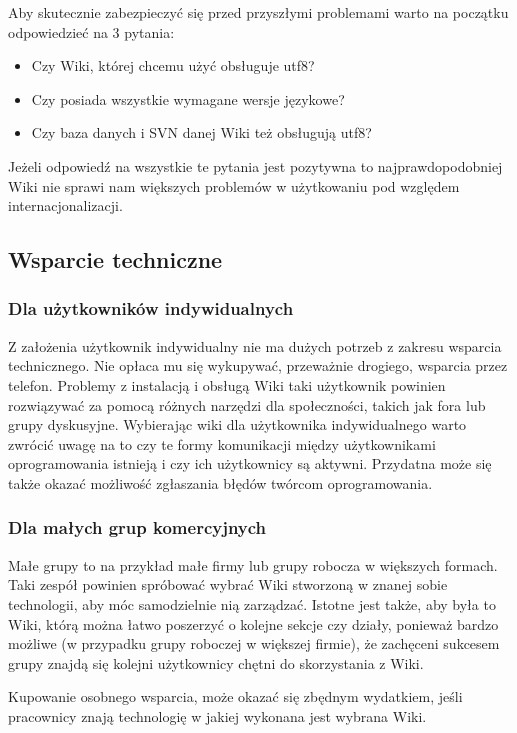 \documentclass{article}
\begin{document}
		
		Aby skutecznie zabezpieczyć się przed przyszłymi problemami warto na początku odpowiedzieć na 3 pytania:  
		\begin{itemize}
			\item Czy Wiki, której chcemu użyć obsługuje utf8?
			\item Czy posiada wszystkie wymagane wersje językowe?
			\item Czy baza danych i SVN danej Wiki też obsługują utf8?
		\end{itemize}
		Jeżeli odpowiedź na wszystkie te pytania jest pozytywna to najprawdopodobniej Wiki nie sprawi nam większych problemów w użytkowaniu pod względem internacjonalizacji.
	
	\subsection{Wsparcie techniczne}
		\subsubsection{Dla użytkowników indywidualnych}


			Z założenia użytkownik indywidualny nie ma dużych potrzeb z zakresu wsparcia technicznego. Nie opłaca mu się wykupywać, przeważnie drogiego, wsparcia przez telefon. Problemy z instalacją i obsługą Wiki taki użytkownik powinien rozwiązywać za pomocą różnych narzędzi dla społeczności, takich jak fora lub grupy dyskusyjne. Wybierając wiki dla użytkownika indywidualnego warto zwrócić uwagę na to czy te formy komunikacji między użytkownikami oprogramowania istnieją i czy ich użytkownicy są aktywni. Przydatna może się także okazać możliwość zgłaszania błędów twórcom oprogramowania.
		
		\subsubsection{Dla małych grup komercyjnych}


			Małe grupy to na przykład małe firmy lub grupy robocza w większych formach. Taki zespół powinien spróbować wybrać Wiki stworzoną w znanej sobie technologii, aby móc samodzielnie nią zarządzać. Istotne jest także, aby była to Wiki, którą można łatwo poszerzyć o kolejne sekcje czy działy, ponieważ bardzo możliwe (w przypadku grupy roboczej w większej firmie), że zachęceni sukcesem grupy znajdą się kolejni użytkownicy chętni do skorzystania z Wiki. 
	

			Kupowanie osobnego wsparcia, może okazać się zbędnym wydatkiem, jeśli pracownicy znają technologię w jakiej wykonana jest wybrana Wiki.
		
\end{document}

